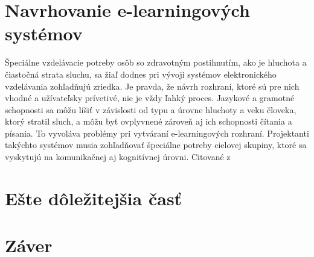 \documentclass[10pt,twoside,slovak,a4paper]{article}
\begin{document}
 \section{Navrhovanie e-learningových systémov} \label{dolezita}
 Špeciálne vzdelávacie potreby osôb so zdravotným postihnutím, ako je hluchota a čiastočná strata sluchu, sa žiaľ dodnes pri vývoji systémov elektronického vzdelávania zohľadňujú zriedka. Je pravda, že návrh rozhraní, ktoré sú pre nich vhodné a užívateľsky prívetivé, nie je vždy ľahký proces. Jazykové a gramotné schopnosti sa môžu líšiť v závislosti od typu a úrovne hluchoty a veku človeka, ktorý stratil sluch, a môžu byť ovplyvnené zároveň aj ich schopnosti čítania a písania. To vyvoláva problémy pri vytváraní e-learningových rozhraní. Projektanti takýchto systémov musia zohľadňovať špeciálne potreby cielovej skupiny, ktoré sa vyskytujú na komunikačnej aj kognitívnej úrovni.
 Citované z \cite{pappas2018learning}




\section{Ešte dôležitejšia časť} \label{dolezitejsia}




\section{Záver} \label{zaver} %






\end{document}
